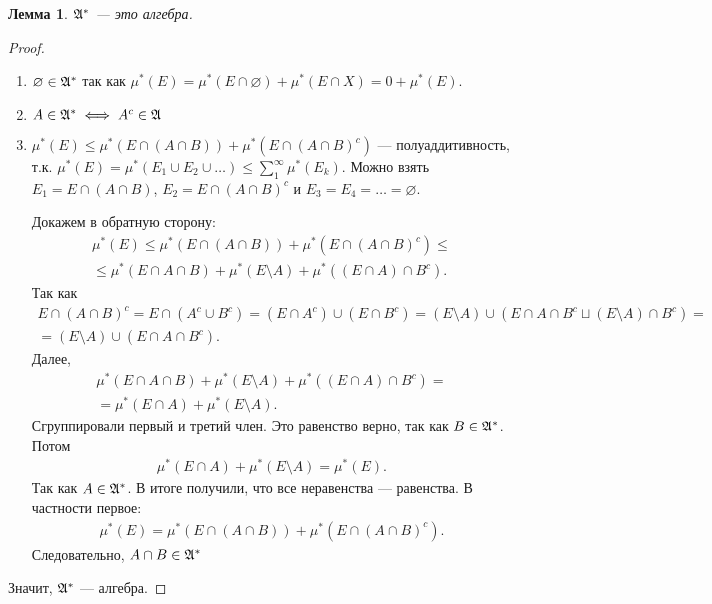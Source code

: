 \documentclass[a4paper,12pt]{article}
\newcounter{theoremCnt}
\theoremstyle{definition}
\theoremstyle{plain}
\theoremstyle{plain}
\newtheorem{lm}[theoremCnt]{Лемма}
\theoremstyle{plain}
\theoremstyle{plain}
\theoremstyle{definition}
\theoremstyle{definition}
\theoremstyle{definition}
\theoremstyle{definition}
\theoremstyle{definition}
\theoremstyle{definition}
\theoremstyle{plain}
\theoremstyle{plain}
\theoremstyle{plain}
\theoremstyle{plain}
\theoremstyle{definition}
\theoremstyle{definition}
\theoremstyle{definition}
\theoremstyle{definition}
\theoremstyle{definition}
\newcommand{\A}{\ensuremath \mathfrak{A}}
\begin{document}
\begin{lm}
 $ \A^\ast $ --- это алгебра.
\end{lm}
\begin{proof}\
 \begin{enumerate}
  \item $ \varnothing \in \A^\ast $ так как $ \mu^\ast(E) = \mu^\ast(E \cap \varnothing) + \mu^\ast(E \cap X) = 0 + \mu^\ast(E) $.
   \setcounter{enumi}{2}
  \item $ A \in \A^\ast \iff A^c \in \A $
   \setcounter{enumi}{1}
  \item $ \mu^\ast(E) \leqslant \mu^\ast(E \cap (A \cap B)) + \mu^\ast(E \cap (A \cap B)^c) $ --- полуаддитивность, т.к. $ \mu^\ast(E) = \mu^\ast(E_1 \cup E_2 \cup \ldots) \leqslant \sum_1^\infty \mu^\ast(E_k)$. Можно взять $ E_1 = E \cap (A \cap B) $, $ E_2 = E \cap (A \cap B)^c $ и $ E_3 = E_4 = \ldots = \varnothing $.

   Докажем в обратную сторону:
   \begin{align*}
     \mu^\ast(E) \leqslant \mu^\ast(E \cap (A \cap B)) + \mu^\ast(E \cap (A \cap B)^c) \leqslant \\
     \leqslant \mu^\ast(E \cap A \cap B) + \mu^\ast(E \setminus A) + \mu^\ast((E \cap A) \cap B^c)
   .\end{align*} Так как
   \begin{align*}
    E \cap (A \cap B)^c = E \cap (A^c \cup B^c) = (E \cap A^c) \cup (E \cap B^c) = (E \setminus A) \cup (E \cap A \cap B^c \sqcup (E \setminus A) \cap B^c) =\\
    = (E \setminus A) \cup (E \cap A \cap B^c)
   .\end{align*} Далее,
   \begin{align*}
    \mu^\ast(E \cap A \cap B) + \mu^\ast(E \setminus A) + \mu^\ast((E \cap A) \cap B^c) = \\
    = \mu^\ast(E \cap A) + \mu^\ast(E \setminus A)
   .\end{align*} Сгруппировали первый и третий член. Это равенство верно, так как $ B \in \A^\ast $. Потом
   \begin{align*}
    \mu^\ast(E \cap A) + \mu^\ast(E \setminus A) = \mu^\ast(E)
   .\end{align*} Так как $ A \in \A^\ast $. В итоге получили, что все неравенства --- равенства. В частности первое:
   \begin{align*}
    \mu^\ast(E) = \mu^\ast(E \cap (A \cap B)) + \mu^\ast(E \cap (A \cap B)^c)
   .\end{align*} Следовательно, $ A \cap B \in \A^\ast $
 \end{enumerate} 
 Значит, $ \A^\ast $ --- алгебра.
\end{proof}
\end{document}
